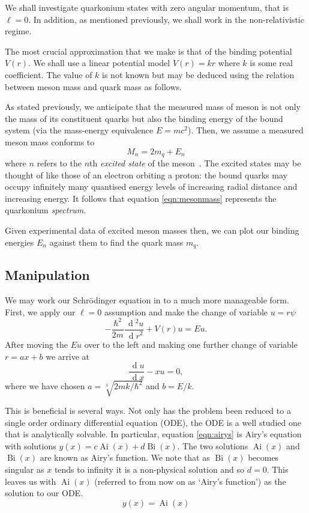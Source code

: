 \documentclass[]{article}
\renewcommand{\d}[1]{\ensuremath{\,\operatorname{d}\!{#1}}}
\newcommand{\Ai}[1]{\ensuremath{\operatorname{Ai}({#1})}}
\newcommand{\Bi}[1]{\ensuremath{\operatorname{Bi}({#1})}}
\begin{document}
We shall investigate quarkonium states with zero angular momentum, that is $\ell = 0$. In addition, as mentioned previously, we shall work in the non-relativistic regime.

The most crucial approximation that we make is that of the binding potential $V(r)$. We shall use a linear potential model $V(r) = kr$ where $k$ is some real coefficient. The value of $k$ is not known but may be deduced using the relation between meson mass and quark mass as follows.

As stated previously, we anticipate that the measured mass of meson is not only the mass of its constituent quarks but also the binding energy of the bound system (via the mass-energy equivalence $E=mc^{2}$). Then, we assume a measured meson mass conforms to
\begin{equation}\label{eqn:mesonmass}
M_{n} = 2m_{q} + E_{n}
\end{equation}
where $n$ refers to the $n$th \emph{excited state} of the meson~\cite{ref:buchmuller}. The excited states may be thought of like those of an electron orbiting a proton: the bound quarks may occupy infinitely many quantised energy levels of increasing radial distance and increasing energy. It follows that equation \ref{eqn:mesonmass} represents the quarkonium \emph{spectrum}.

Given experimental data of excited meson masses then, we can plot our binding energies $E_{n}$ against them to find the quark mass $m_{q}$.

\subsection{Manipulation}

We may work our Schr\"{o}dinger equation in to a much more manageable form. First, we apply our $\ell = 0$ assumption and make the change of variable $u = r\psi$
\[
-\frac{\hbar^{2}}{2m}
 \frac{\d{^{2}u}}{\d{r}^{2}}
+ V(r)u = Eu.
\]
After moving the $Eu$ over to the left and making one further change of variable $r = ax + b$ we  arrive at
\begin{equation}\label{eqn:airys}
\frac{\d{u}}{\d{x}} - xu = 0,
\end{equation}
where we have chosen $a = \sqrt[3]{2mk/\hbar^{2}}$ and $b = E/k$.

This is beneficial is several ways. Not only has the problem been reduced to a single order ordinary differential equation (ODE), the ODE is a well studied one that is analytically solvable. In particular, equation \ref{eqn:airys} is Airy's equation with solutions $y(x) = c\Ai{x} + d\Bi{x}$. The two solutions $\Ai{x}$ and $\Bi{x}$ are known as Airy's function. We note that as $\Bi{x}$ becomes singular as $x$ tends to infinity it is a non-physical solution and so $d = 0$. This leaves us with $\Ai{x}$ (referred to from now on as `Airy's function') as the solution to our ODE.\footnotemark
\[
y(x) = \Ai{x}
\]
\end{document}
